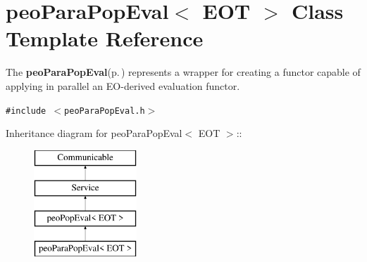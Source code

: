\section{peo\-Para\-Pop\-Eval$<$ EOT $>$ Class Template Reference}
\label{classpeo_para_pop_eval}
The {\bf peo\-Para\-Pop\-Eval}{\rm (p.\,\pageref{classpeo_para_pop_eval})} represents a wrapper for creating a functor capable of applying in parallel an EO-derived evaluation functor.  


{\tt \#include $<$peo\-Para\-Pop\-Eval.h$>$}

Inheritance diagram for peo\-Para\-Pop\-Eval$<$ EOT $>$::\begin{figure}[H]
\begin{center}
\leavevmode
\includegraphics[height=4cm]{classpeo_para_pop_eval}
\end{center}
\end{figure}
